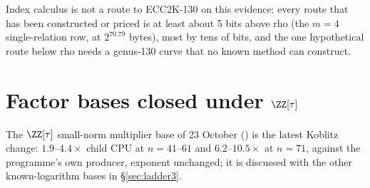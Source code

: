 Index calculus is not a route to ECC2K-130 on this evidence: every route
that has been constructed or priced is at least about 5 bits above rho (the
$m=4$ single-relation row, at $2^{70.79}$ bytes), most by tens of bits, and
the one hypothetical route below rho needs a genus-130 curve that no known
method can construct.

\section{Factor bases closed under $\ZZ[\tau]$}

The $\ZZ[\tau]$ small-norm multiplier base of 23 October
() is the latest Koblitz
change: $1.9$--$4.4\times$ child CPU at $n=41$--$61$ and $6.2$--$10.5\times$
at $n=71$, against the programme's own producer, exponent unchanged; it is
discussed with the other known-logarithm bases in \S\ref{sec:ladder3}.
